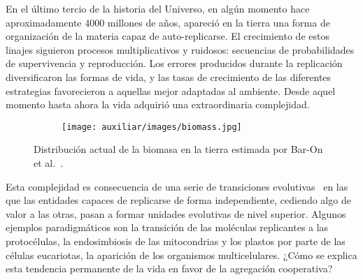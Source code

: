 \documentclass[a4paper,10pt]{article}
\begin{document}
En el último tercio de la historia del Universo, en algún momento hace aproximadamente 4000 millones de años, apareció en la tierra una forma de organización de la materia capaz de auto-replicarse.
El crecimiento de estos linajes siguieron procesos multiplicativos y ruidosos: secuencias de probabilidades de supervivencia y reproducción.
Los errores producidos durante la replicación diversificaron las formas de vida, y las tasas de crecimiento de las diferentes estrategias favorecieron a aquellas mejor adaptadas al ambiente.
Desde aquel momento hasta ahora la vida adquirió una extraordinaria complejidad.
%
\begin{figure}[H]
    \centering
    \begin{subfigure}[b]{0.65\textwidth}
    \texttt{[image: auxiliar/images/biomass.jpg]}
    \end{subfigure}
    \caption{
	Distribución actual de la biomasa en la tierra estimada por Bar-On et al.~\cite{barOn2018-biomass}.
    }
    \label{fig:biomass}
\end{figure}
%
Esta complejidad es consecuencia de una serie de transiciones evolutivas~\cite{maynardSmith1995-majorTransitions} en las que las entidades capaces de replicarse de forma independiente, cediendo algo de valor a las otras, pasan a formar unidades evolutivas de nivel superior.
Algunos ejemplos paradigmáticos son la transición de las moléculas replicantes a las protocélulas, la endosimbiosis de las mitocondrias y los plastos por parte de las células eucariotas, la aparición de los organismos multicelulares.
¿Cómo se explica esta tendencia permanente de la vida en favor de la agregación cooperativa?
\end{document}
